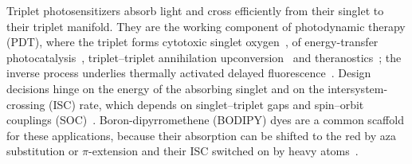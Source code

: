 \documentclass[journal=jctcce,manuscript=article,layout=twocolumn]{achemso}
\begin{document}
Triplet photosensitizers absorb light and cross efficiently from their singlet to their triplet
manifold. They are the working component of photodynamic therapy (PDT), where the triplet forms
cytotoxic singlet oxygen~\cite{Agostinis2011,Hamblin2004,Wainwright2017,Cieplik2018}, of energy-transfer
photocatalysis~\cite{StriethKalthoff2018,Grosskopf2022}, triplet--triplet annihilation
upconversion~\cite{SinghRachford2010,Bharmoria2020} and theranostics~\cite{Awuah2012,Kowada2015,Wang2024BODIPY};
the inverse process underlies thermally activated delayed fluorescence~\cite{Uoyama2012,Wong2017,Yang2017TADF}.
Design decisions hinge on the energy of the absorbing singlet and on the intersystem-crossing (ISC)
rate, which depends on singlet--triplet gaps and spin--orbit couplings
(SOC)~\cite{Marian2012,Marian2021,Penfold2018,Zhao2013}.
Boron-dipyrromethene (BODIPY) dyes are a common scaffold for these applications, because their
absorption can be shifted to the red by aza substitution or $\pi$-extension and their ISC switched on
by heavy atoms~\cite{Loudet2007,Kamkaew2013,Zhao2015BODIPY}.
\end{document}
